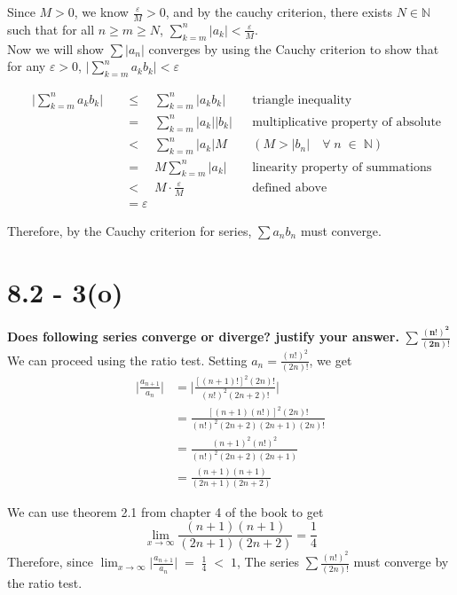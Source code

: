 \documentclass[11pt]{article}
\begin{document}
Since \(M > 0\), we know \(\frac{\varepsilon}{M} > 0\), and by the cauchy criterion, there exists \(N \in \mathbb N\) 
such that for all \(n \geq m \geq N\), \(\displaystyle\sum_{k=m}^{n}|a_k| < \frac{\varepsilon}{M}\). \\ 

Now we will show  \(\sum |a_n|\) converges by using the Cauchy criterion to show that for any \(\varepsilon > 0\), 
\(\bigg| \displaystyle\sum_{k=m}^{n} a_k b_k \bigg| < \varepsilon\)

\begin{align*}
  && \bigg| \displaystyle\sum_{k=m}^{n} a_k b_k \bigg| \quad&\leq\quad \displaystyle\sum_{k=m}^{n} |a_k b_k| && 
  \text{triangle inequality} \\ 
  && &=\quad \displaystyle\sum_{k=m}^{n} |a_k||b_k| && \text{multiplicative property of absolute values} \\
  && &<\quad \displaystyle\sum_{k=m}^{n} |a_k|M && (M > |b_n| \quad\forall\; n \;\in\; \mathbb N) \\
  && &=\quad M \displaystyle\sum_{k=m}^{n} |a_k| && \text{linearity property of summations} \\
  && &<\quad M \cdot \frac{\varepsilon}{M} && \text{defined above} \\
  && &= \varepsilon &&
\end{align*}

Therefore, by the Cauchy criterion for series, \(\sum a_n b_n\) must converge.
\newpage

\section*{8.2 - 3(o)}
\textbf{Does following series converge or diverge? justify your answer.} \quad
\(\mathbf{\displaystyle\sum \frac{(n!)^2}{(2n)!}}\) \\ 

We can proceed using the ratio test.  Setting \(a_n = \frac{(n!)^2}{(2n)!}\), we get 
\begin{align*}
  && \Big| \frac{a_{n+1}}{a_n} \Big| &= \bigg| \frac{[(n+1)!]^2(2n)!}{(n!)^2(2n+2)!} \bigg| && \\
  && &= \frac{[(n+1)(n!)]^2(2n)!}{(n!)^2(2n+2)(2n+1)(2n)!} && \\
  && &= \frac{(n+1)^2(n!)^2}{(n!)^2(2n+2)(2n+1)} && \\
  && &= \frac{(n+1)(n+1)}{(2n+1)(2n+2)}
\end{align*}

We can use theorem 2.1 from chapter 4 of the book to get
\[\lim_{x\to\infty} \frac{(n+1)(n+1)}{(2n+1)(2n+2)} = \frac{1}{4}\]
Therefore, since \(\displaystyle\lim_{x\to\infty} \Big| \frac{a_{n+1}}{a_n} \Big| \;=\; \frac{1}{4} \;<\; 1\), 
The series \(\displaystyle\sum \frac{(n!)^2}{(2n)!}\) must converge by the ratio test.
\newpage
\end{document}
